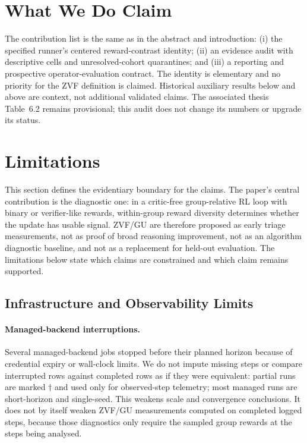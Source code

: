 \section*{What We Do Claim}
\label{sec:what_we_claim}

The contribution list is the same as in the abstract and introduction:
(i) the specified runner's centered reward-contrast identity;
(ii) an evidence audit with descriptive cells and unresolved-cohort quarantines;
and (iii) a reporting and prospective operator-evaluation contract.
The identity is elementary and no priority for the ZVF definition is claimed.
Historical auxiliary results below and above are context, not additional
validated claims. The associated thesis Table~6.2 remains provisional; this
audit does not change its numbers or upgrade its status.

\section{Limitations}
\label{sec:limitations}

This section defines the evidentiary boundary for the claims.  The paper's
central contribution is the diagnostic one: in a critic-free group-relative RL
loop with binary or verifier-like rewards, within-group reward diversity
determines whether the update has usable signal.  ZVF/GU are therefore proposed
as early triage measurements, not as proof of broad reasoning improvement, not
as an algorithm diagnostic baseline, and not as a replacement for held-out evaluation.
The limitations below state which claims are constrained and which claim remains
supported.

\subsection{Infrastructure and Observability Limits}
\label{sec:infra_failures}

\paragraph{Managed-backend interruptions.}
Several managed-backend jobs stopped before their planned horizon because of
credential expiry or wall-clock limits.  We do not impute missing steps or
compare interrupted rows against completed rows as if they were equivalent:
partial runs are marked $\dagger$ and used only for observed-step telemetry;
most managed runs are short-horizon and single-seed.
This weakens scale and convergence conclusions.  It does not by itself weaken
ZVF/GU measurements computed on completed logged steps, because those diagnostics
only require the sampled group rewards at the steps being analysed.

